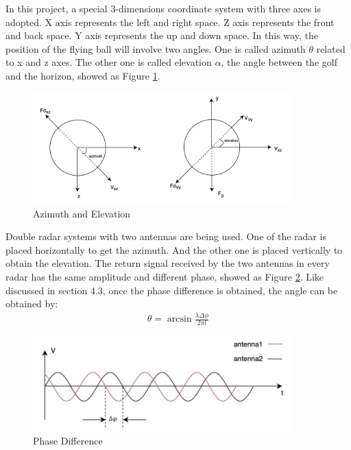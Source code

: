 In this project, a special 3-dimensions coordinate system with three axes is adopted. X axis represents the left and right space. Z axis represents the front and back space. Y axis represents the up and down space. In this way, the position of the flying ball will involve two angles. One is called azimuth $\theta$ related to x and z axes. The other one is called elevation $\alpha$, the angle between the golf and the horizon, showed as Figure \ref{fig:angle}.
\begin{figure}[H]
    \centering
    \includegraphics[width=10cm]{figure/Angle.png}
    \caption{Azimuth and Elevation}
    \label{fig:angle}
\end{figure}
Double radar systems with two antennas are being used. One of the radar is placed horizontally to get the azimuth. And the other one is placed vertically to obtain the elevation. The return signal received by the two antennas in every radar has the same amplitude and different phase, showed as Figure \ref{fig:PD}. Like discussed in section 4.3, once the phase difference is obtained, the angle can be obtained by: 
\begin{align}
 \theta=\arcsin \frac{\lambda \Delta \phi}{2 \pi l}   
\end{align}
\begin{figure}[H]
    \centering
    \includegraphics[width=10cm]{figure/Phase3.png}
    \caption{Phase Difference}
    \label{fig:PD}
\end{figure}
